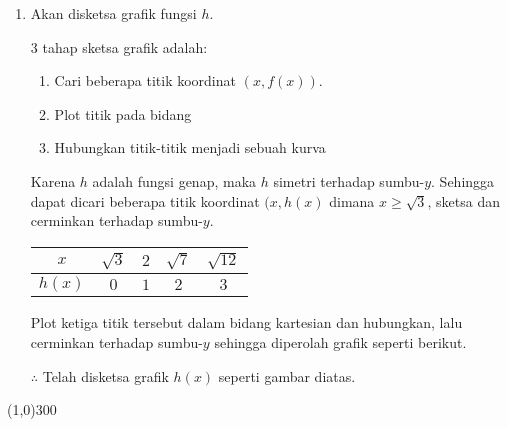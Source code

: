 \begin{enumerate}[leftmargin=*, label={\arabic*}.]
\begin{enumerate}[label={\alph*}.]
    \item Akan disketsa grafik fungsi $h$.
    
    3 tahap sketsa grafik adalah:
        \begin{enumerate}[label={\arabic*})]
        \item Cari beberapa titik koordinat $(x,f(x))$.
        \item Plot titik pada bidang
        \item Hubungkan titik-titik menjadi sebuah kurva
        \end{enumerate}
    Karena $h$ adalah fungsi genap, maka $h$ simetri terhadap sumbu-$y$.
    Sehingga dapat dicari beberapa titik koordinat $(x,h(x)$ dimana 
    $x \geq \sqrt{3}$, sketsa dan cerminkan terhadap sumbu-$y$.
    \begin{center}
    \begin{tabular}{|c|c|c|c|c|}\hline
        $x$ & $\sqrt{3}$ & $2$ & $\sqrt{7}$ & $\sqrt{12}$ \\ \hline
        $h(x)$ & $0$ & $1$ & $2$ & $3$ \\ \hline
    \end{tabular}
    \end{center}
    Plot ketiga titik tersebut dalam bidang kartesian dan hubungkan, lalu cerminkan
    terhadap sumbu-$y$ sehingga diperolah grafik seperti berikut.

    
    
    $\therefore$ Telah disketsa grafik $h(x)$ seperti gambar diatas.
    
    \end{enumerate}

\begin{center}\line(1,0){300}\end{center}



\end{enumerate}
